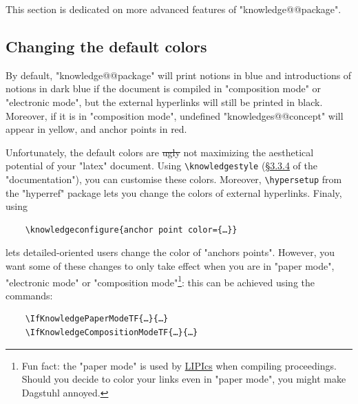 \documentclass{article}
\begin{document}
This section is dedicated on more advanced features of "knowledge@@package".

\subsection{Changing the default colors}

By default, "knowledge@@package" will print notions in blue and
introductions of notions in dark blue if the document is compiled
in "composition mode" or "electronic mode", but the external hyperlinks
will still be printed in black. Moreover, if it is in
"composition mode", undefined "knowledges@@concept" will appear in yellow,
and anchor points in red.

Unfortunately, the default colors are \sout{ugly} not maximizing the aesthetical potential of your "latex" document.
Using \verb|\knowledgestyle| (\href{https://distrib-coffee.ipsl.jussieu.fr/pub/mirrors/ctan/macros/latex/contrib/knowledge/knowledge.pdf#subsubsection.3.3.4}{§3.3.4} of the "documentation"), you can customise these colors. Moreover,
\verb|\hypersetup| from the "hyperref" package lets you change the colors of
external hyperlinks. Finaly, using
\begin{verbatim}
    \knowledgeconfigure{anchor point color={…}}
\end{verbatim}
lets detailed-oriented users change the color of "anchors points".
However, you want some of these changes to only take effect when you are in
"paper mode", "electronic mode" or "composition mode"\footnote{Fun fact:
the "paper mode" is used by \href{https://www.dagstuhl.de/en/publications/lipics}{LIPIcs} when compiling proceedings. Should you decide
to color your links even in "paper mode", you might make Dagstuhl annoyed.}:
this can be achieved using the commands:
\begin{verbatim}
    \IfKnowledgePaperModeTF{…}{…}
    \IfKnowledgeCompositionModeTF{…}{…}
\end{verbatim}
\end{document}
